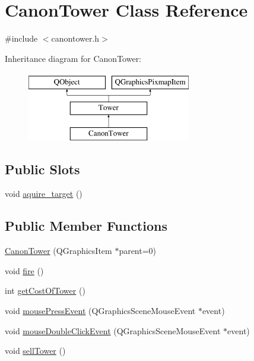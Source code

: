 \hypertarget{class_canon_tower}{}\section{Canon\+Tower Class Reference}
\label{class_canon_tower}


{\ttfamily \#include $<$canontower.\+h$>$}

Inheritance diagram for Canon\+Tower\+:\begin{figure}[H]
\begin{center}
\leavevmode
\includegraphics[height=3.000000cm]{class_canon_tower}
\end{center}
\end{figure}
\subsection*{Public Slots}
\begin{DoxyCompactItemize}
\item 
void \hyperlink{class_canon_tower_a02bacc0ba6efc6252b15c0daffbf87a9}{aquire\+\_\+target} ()
\end{DoxyCompactItemize}
\subsection*{Public Member Functions}
\begin{DoxyCompactItemize}
\item 
\hyperlink{class_canon_tower_a52a7edf2351dcf8646f25ff97c97cdf3}{Canon\+Tower} (Q\+Graphics\+Item $\ast$parent=0)
\item 
void \hyperlink{class_canon_tower_aa8d13cf8b8d530256b95746620e16234}{fire} ()
\item 
int \hyperlink{class_canon_tower_ac0e57d350da509e89e926afe950ab291}{get\+Cost\+Of\+Tower} ()
\item 
void \hyperlink{class_canon_tower_a15edd7ff8846e44faaca6ab5e7b183dc}{mouse\+Press\+Event} (Q\+Graphics\+Scene\+Mouse\+Event $\ast$event)
\item 
void \hyperlink{class_canon_tower_ac4956cf0bb621db0874403551eaf1eb1}{mouse\+Double\+Click\+Event} (Q\+Graphics\+Scene\+Mouse\+Event $\ast$event)
\item 
void \hyperlink{class_canon_tower_a5bfc0567c8907e8a6ddf4722f6783cd0}{sell\+Tower} ()
\end{DoxyCompactItemize}
